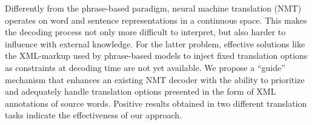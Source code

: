 Differently from the phrase-based paradigm, neural machine translation (NMT) operates on word and sentence representations in a continuous space. This makes the decoding process not only more difficult to interpret, but also harder to influence with external knowledge. For the latter problem, effective solutions like the XML-markup used by phrase-based models to inject fixed translation options as constraints at decoding time are not yet available. We propose a ``guide'' mechanism that enhances an existing NMT decoder with the ability to prioritize and adequately handle translation options presented in the form of XML annotations of source words. Positive results obtained in two different translation tasks indicate the effectiveness of our approach.
